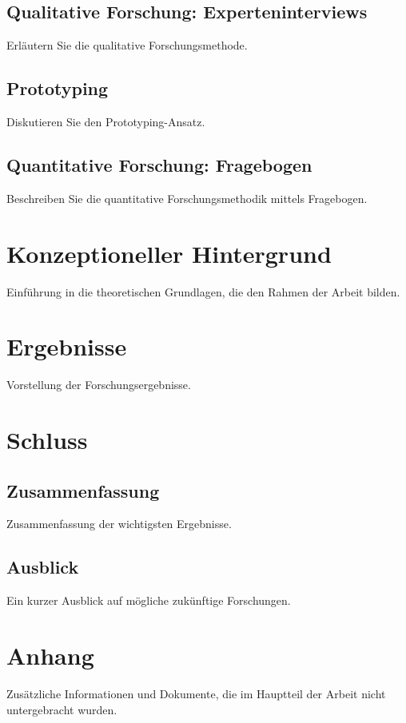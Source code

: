 \documentclass[12pt, a4paper, oneside]{article}
\begin{document}
	\subsection{Qualitative Forschung: Experteninterviews}
	Erläutern Sie die qualitative Forschungsmethode.
	
	\subsection{Prototyping}
	Diskutieren Sie den Prototyping-Ansatz.
	
	\subsection{Quantitative Forschung: Fragebogen}
	Beschreiben Sie die quantitative Forschungsmethodik mittels Fragebogen.
	
	\section{Konzeptioneller Hintergrund}
	Einführung in die theoretischen Grundlagen, die den Rahmen der Arbeit bilden.
	
	\section{Ergebnisse}
	Vorstellung der Forschungsergebnisse.
	
	\section{Schluss}
	\subsection{Zusammenfassung}
	Zusammenfassung der wichtigsten Ergebnisse.
	
	\subsection{Ausblick}
	Ein kurzer Ausblick auf mögliche zukünftige Forschungen.
	
	\newpage
	\section*{Anhang}
	Zusätzliche Informationen und Dokumente, die im Hauptteil der Arbeit nicht untergebracht wurden.
	
\end{document}
